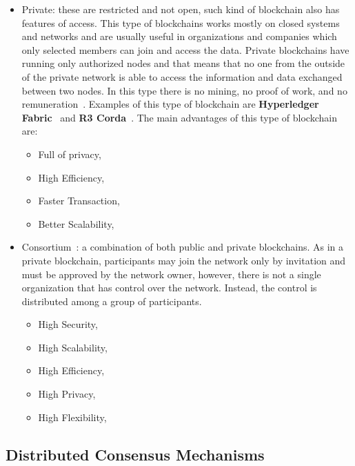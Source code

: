 \begin{itemize}
    \item {Private}: these are restricted and not open, such kind of blockchain also has features of access. This type of blockchains works mostly on closed systems and networks and are usually
          useful in organizations and companies which only selected members can join and access the data. Private blockchains have running only authorized nodes and that means that no one from the outside
          of the private network is able to access the information and data exchanged between two nodes. In this type there is no mining, no proof of work, and no remuneration~\cite{guegan:halshs-01524440}.
          Examples of this type of blockchain are \textbf{Hyperledger Fabric}~\cite{hyperLedger} and \textbf{R3 Corda}~\cite{r3Corda}.
          The main advantages of this type of blockchain are:
          \begin{itemize}
              \item Full of privacy,
              \item High Efficiency,
              \item Faster Transaction,
              \item Better Scalability,
          \end{itemize}
    \item {Consortium~\cite{KASI20221}}: a combination of both public and private blockchains. As in a private blockchain, participants may join the network only by invitation and must be approved by the network owner, however,
          there is not a single organization that has control over the network. Instead, the control is distributed among a group of participants.
          \begin{itemize}
              \item High Security,
              \item High Scalability,
              \item High Efficiency,
              \item High Privacy,
              \item High Flexibility,
          \end{itemize}

\end{itemize}

\subsection*{Distributed Consensus Mechanisms}\label{subsec:distributed-consensus-mechanisms}
